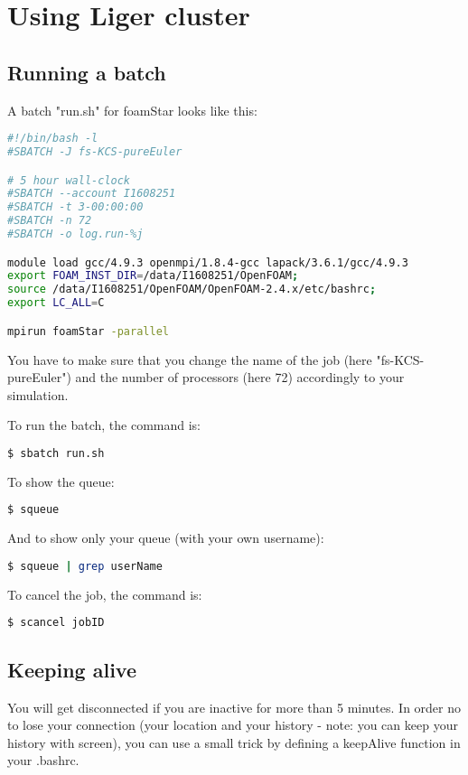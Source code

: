 \chapter{Using Liger cluster}


\section{Running a batch}

A batch "run.sh" for foamStar looks like this:
\begin{lstlisting}[language=bash]
#!/bin/bash -l
#SBATCH -J fs-KCS-pureEuler

# 5 hour wall-clock 
#SBATCH --account I1608251
#SBATCH -t 3-00:00:00
#SBATCH -n 72
#SBATCH -o log.run-%j

module load gcc/4.9.3 openmpi/1.8.4-gcc lapack/3.6.1/gcc/4.9.3
export FOAM_INST_DIR=/data/I1608251/OpenFOAM;
source /data/I1608251/OpenFOAM/OpenFOAM-2.4.x/etc/bashrc;
export LC_ALL=C

mpirun foamStar -parallel
\end{lstlisting}
You have to make sure that you change the name of the job (here "fs-KCS-pureEuler") and the number of processors (here 72) accordingly to your simulation.

To run the batch, the command is:
\begin{lstlisting}[language=bash]
  $ sbatch run.sh
\end{lstlisting}


To show the queue:
\begin{lstlisting}[language=bash]
  $ squeue
\end{lstlisting}

And to show only your queue (with your own username):
\begin{lstlisting}[language=bash]
  $ squeue | grep userName
\end{lstlisting}


To cancel the job, the command is:
\begin{lstlisting}[language=bash]
  $ scancel jobID
\end{lstlisting}


\section{Keeping alive}

You will get disconnected if you are inactive for more than 5 minutes. In order no to lose your connection (your location and your history - note: you can keep your history with screen), you can use a small trick by defining a keepAlive function in your .bashrc.


